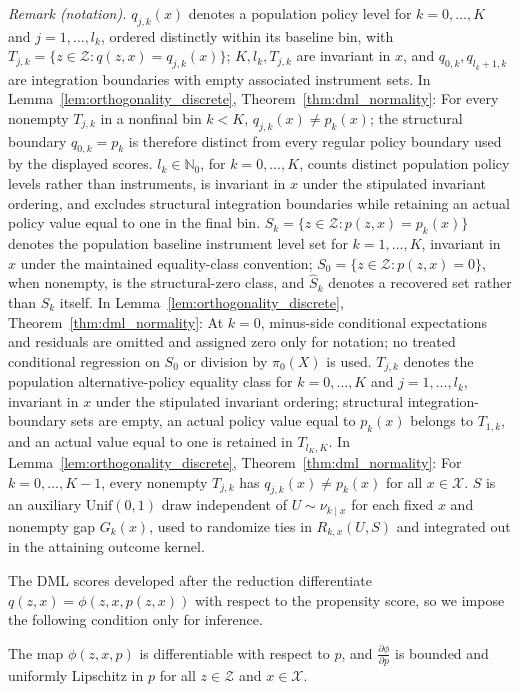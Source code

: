 \noindent\textit{Remark (notation).} $q_{j,k}(x)$ denotes a population policy level for $k=0,\ldots,K$ and $j=1,\ldots,l_k$, ordered distinctly within its baseline bin, with $T_{j,k}=\{z\in\mathcal Z:q(z,x)=q_{j,k}(x)\}$; $K,l_k,T_{j,k}$ are invariant in $x$, and $q_{0,k},q_{l_k+1,k}$ are integration boundaries with empty associated instrument sets. In Lemma~\ref{lem:orthogonality_discrete}, Theorem~\ref{thm:dml_normality}: For every nonempty $T_{j,k}$ in a nonfinal bin $k<K$, $q_{j,k}(x)\neq p_k(x)$; the structural boundary $q_{0,k}=p_k$ is therefore distinct from every regular policy boundary used by the displayed scores. $l_k\in\mathbb N_0$, for $k=0,\ldots,K$, counts distinct population policy levels rather than instruments, is invariant in $x$ under the stipulated invariant ordering, and excludes structural integration boundaries while retaining an actual policy value equal to one in the final bin. $S_k=\{z\in\mathcal Z:p(z,x)=p_k(x)\}$ denotes the population baseline instrument level set for $k=1,\ldots,K$, invariant in $x$ under the maintained equality-class convention; $S_0=\{z\in\mathcal Z:p(z,x)=0\}$, when nonempty, is the structural-zero class, and $\widehat S_k$ denotes a recovered set rather than $S_k$ itself. In Lemma~\ref{lem:orthogonality_discrete}, Theorem~\ref{thm:dml_normality}: At $k=0$, minus-side conditional expectations and residuals are omitted and assigned zero only for notation; no treated conditional regression on $S_0$ or division by $\pi_0(X)$ is used. $T_{j,k}$ denotes the population alternative-policy equality class for $k=0,\ldots,K$ and $j=1,\ldots,l_k$, invariant in $x$ under the stipulated invariant ordering; structural integration-boundary sets are empty, an actual policy value equal to $p_k(x)$ belongs to $T_{1,k}$, and an actual value equal to one is retained in $T_{l_K,K}$. In Lemma~\ref{lem:orthogonality_discrete}, Theorem~\ref{thm:dml_normality}: For $k=0,\ldots,K-1$, every nonempty $T_{j,k}$ has $q_{j,k}(x)\neq p_k(x)$ for all $x\in\mathcal X$. $S$ is an auxiliary $\mathrm{Unif}(0,1)$ draw independent of $U\sim\nu_{k\mid x}$ for each fixed $x$ and nonempty gap $G_k(x)$, used to randomize ties in $R_{k,x}(U,S)$ and integrated out in the attaining outcome kernel.


The DML scores developed after the reduction differentiate $q(z,x)=\phi(z,x,p(z,x))$ with respect to the propensity score, so we impose the following condition only for inference.

\begin{assumption}\label{asp:phi_smooth}
    The map $\phi(z,x,p)$ is differentiable with respect to $p$, and $\frac{\partial \phi}{\partial p}$ is bounded and uniformly Lipschitz in $p$ for all $z \in \mathcal{Z}$ and $x \in \mathcal{X}$.
\end{assumption}

